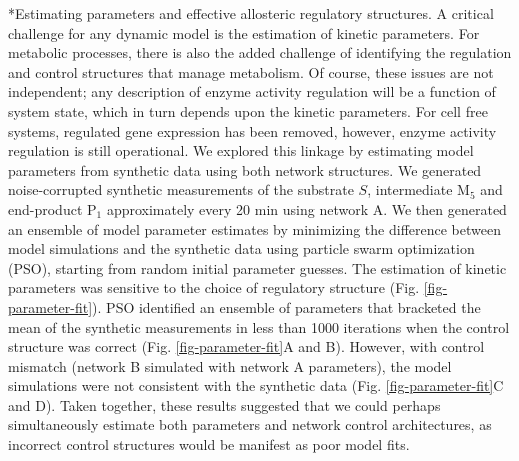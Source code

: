 \documentclass[12pt]{article}
\makeatletter
\renewcommand\subsection{\@startsection
	{subsection}{2}{0mm}
	{-0.05in}
	{-0.5\baselineskip}
	{\normalfont\normalsize\bfseries}}
\makeatother
\begin{document}
\subsection*{Estimating parameters and effective allosteric regulatory structures.}
A critical challenge for any dynamic model is the estimation of kinetic parameters. 
For metabolic processes, there is also the added challenge of identifying the regulation and control structures that manage metabolism.  
Of course, these issues are not independent; any description of enzyme activity regulation will be a function of system state, which
in turn depends upon the kinetic parameters. For cell free systems, regulated gene expression has been removed, however, enzyme activity regulation is still operational. 
We explored this linkage by estimating model parameters from synthetic data using both network
structures. We generated noise-corrupted synthetic measurements of the substrate $S$, intermediate M$_{5}$ and end-product P$_1$ approximately every 20 min using
network A. We then generated an ensemble of model parameter estimates by minimizing the difference between model simulations and the synthetic data using particle swarm
optimization (PSO), starting from random initial parameter guesses. The estimation of kinetic parameters was sensitive to the choice of regulatory structure (Fig. \ref{fig-parameter-fit}).
PSO identified an ensemble of parameters that bracketed the mean of the synthetic measurements in less than 1000 iterations 
when the control structure was correct (Fig. \ref{fig-parameter-fit}A and B).
However, with control mismatch (network B simulated with network A parameters), the model simulations were not consistent with the synthetic data  (Fig. \ref{fig-parameter-fit}C and D). 
Taken together, these results suggested that we could perhaps simultaneously estimate both parameters and network control architectures, as incorrect control structures 
would be manifest as poor model fits.
\end{document}

